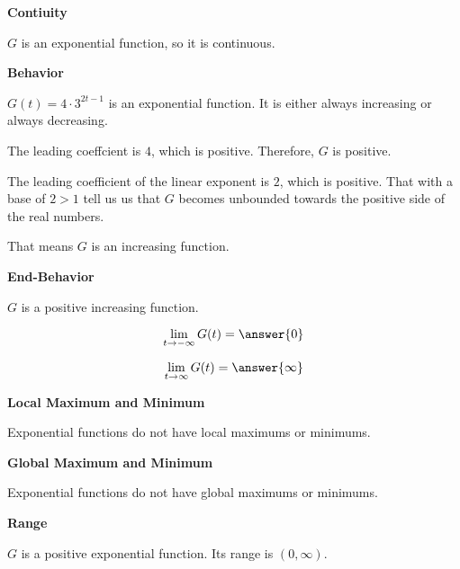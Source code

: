 \documentclass{ximera}
\begin{document}
\begin{example}
\textbf{Contiuity}


$G$ is an exponential function, so it is continuous.




\textbf{Behavior}

$G(t) = 4 \cdot 3^{2t-1}$ is an exponential function.  It  is either always increasing or always decreasing.


The leading coeffcient is $4$, which is positive.  Therefore, $G$ is positive.

The leading coefficient of the linear exponent is $2$, which is positive.  That with a base of $2 > 1$ tell us us that $G$ becomes unbounded towards the positive side of the real numbers.


That means $G$ is an increasing function.




\textbf{End-Behavior}


$G$ is a positive increasing function.



\[
\lim\limits_{t \to -\infty}G(t) = \answer{0}  
\]

\[
\lim\limits_{t \to \infty}G(t) = \answer{\infty}
\]





\textbf{Local Maximum and Minimum}

Exponential functions do not have local maximums or minimums.






\textbf{Global Maximum and Minimum}

Exponential functions do not have global maximums or minimums.




\textbf{Range}



$G$ is a positive exponential function.   Its range is $(0, \infty)$.



\end{example}
\end{document}
